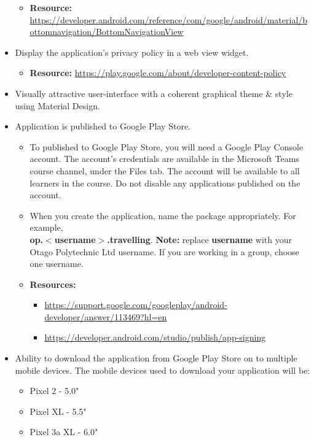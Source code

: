 \documentclass{article}
\begin{document}
\begin{itemize}
	      \begin{itemize}
	      	\item \textbf{Resource:} \footnotesize\href{https://developer.android.com/reference/com/google/android/material/bottomnavigation/BottomNavigationView}{https://developer.android.com/reference/com/google/android/material/bottomnavigation/BottomNavigationView}
	      \end{itemize}
	\item Display the application's privacy policy in a web view widget.
	      \begin{itemize}
	      	\item \textbf{Resource:} \footnotesize\href{https://play.google.com/about/developer-content-policy}{https://play.google.com/about/developer-content-policy}
	      \end{itemize}
	\item Visually attractive user-interface with a coherent graphical theme \& style using Material Design.
	\item Application is published to Google Play Store.
	      \begin{itemize}
	      	\item To published to Google Play Store, you will need a Google Play Console account. The account's credentials are available in the Microsoft Teams course channel, under the Files tab. The account will be available to all learners in the course. Do not disable any applications published on the account.
	      	\item When you create the application, name the package appropriately. For example, \\ \textbf{op.$<$username$>$.travelling}. \textbf{Note:} replace \textbf{username} with your Otago Polytechnic Ltd username. If you are working in a group, choose one username.
	      	\item \textbf{Resources:}
	      	      \begin{itemize}
	      	      	\item \footnotesize\href{https://support.google.com/googleplay/android-developer/answer/113469?hl=en}{https://support.google.com/googleplay/android-developer/answer/113469?hl=en}
	      	      	\item \footnotesize\href{https://developer.android.com/studio/publish/app-signing}{https://developer.android.com/studio/publish/app-signing}
	      	      \end{itemize}
	      \end{itemize}
	\item Ability to download the application from Google Play Store on to multiple mobile devices. The mobile devices used to download your application will be:
	      \begin{itemize}
	      	\item Pixel 2 - 5.0"
	      	\item Pixel XL - 5.5"
	      	\item Pixel 3a XL - 6.0"
	      \end{itemize} 
\end{itemize}
\end{document}
